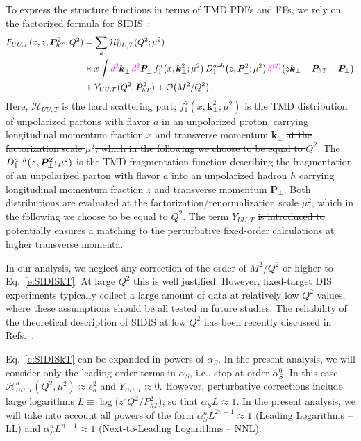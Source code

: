 \documentclass[aps,preprintnumbers,showpacs,nofootinbib,superscriptaddress,floatfix]{revtex4}
\newcommand{\AS}[1]{{\textcolor[rgb]{1,0,1}{#1}}}
\newcommand{\smarrow}{\mbox{\raisebox{-4.5pt}[0pt][0pt]{$\hspace{-1pt} 
		\vec{\phantom{v}}$}}}
\newcommand{\T}{\perp}
\newcommand{\Tperp}{T}
\begin{document}
To express the structure functions in terms of TMD PDFs and FFs, 
we rely on the factorized formula 
for SIDIS~\cite{Collins:1981uk,Collins:1984kg,Ji:2002aa,Ji:2004wu,%
Collins:2011zzd,Aybat:2011zv,GarciaEchevarria:2011rb,Echevarria:2012pw,%
Collins:2012uy}:  
\begin{align}
\label{e:SIDISkT}
   F_{UU,T}(x,z, \bm{P}_{h \Tperp}^2, Q^2) &= \sum_a \mathcal{H}_{UU,T}^{a}(Q^2;\mu^2) \\ 
      &\times x \int \AS{d^2}\bm{k}_\T^{} \, \AS{d^2}\bm{P}_\T^{} \,  f_1^a\big(x,\bm{k}_{\T}^2; \mu^2 \big) \, D_{1}^{a\smarrow h}\big(z,\bm{P}_{\T}^2; \mu^2 \big) \,
      \AS{\delta^{(2)}} \big(z {\bm k}_{\T} - {\bm P}_{h \Tperp} + {\bm P}_{\T}\big)
\nonumber\\&
\nonumber + Y_{UU,T}\big(Q^2, \bm{P}_{h\Tperp}^2\big) + \mathcal{O}\big(M^2/Q^2\big) \, .
\end{align} 
Here, $\mathcal{H}_{UU,T}$ is the hard scattering part; $f_1^a(x,\bm{k}_{\T}^2;
\mu^2)$ is the TMD distribution of unpolarized partons with flavor $a$ in an unpolarized
proton, carrying longitudinal momentum fraction $x$ and transverse momentum
$\bm{k}_\T$ \AS{\sout{at the factorization scale $\mu^2$, which in the following we
choose to be equal to $Q^2$}}.  The $D_1^{a\smarrow h}(z, \bm{P}_{\T}^2;
\mu^2)$ is the TMD fragmentation function describing the fragmentation of an unpolarized parton with flavor $a$ into
an unpolarized hadron $h$ carrying longitudinal momentum fraction $z$ and
transverse momentum $\bm{P}_\T$. 
\AS{Both distributions are evaluated at the factorization/renormalization scale $\mu^2$, which in the following we
choose to be equal to $Q^2$.} 
The term $Y_{UU,T}$ \AS{\sout{is introduced to} potentially ensures} a matching
to the perturbative fixed-order calculations at higher transverse momenta. 

In our analysis, we neglect any correction of the order of $M^2/Q^2$ or higher
to  Eq.~\eqref{e:SIDISkT}.
At large $Q^2$ this is well justified. 
However, fixed-target DIS experiments typically 
collect a large amount of data
at relatively low $Q^2$ values, where these assumptions
should be all tested in future studies. The reliability
of the theoretical description of SIDIS at low $Q^2$ has been recently
discussed in Refs.~\cite{Boglione:2016bph,Moffat:2017sha}.
 
Eq.~\eqref{e:SIDISkT} can be expanded in powers
of $\alpha_S$. In the present analysis, we 
will consider only the leading order terms in $\alpha_S$, i.e., stop at
order $\alpha_S^0$. In this case 
$\mathcal{H}^a_{UU,T} (Q^2, \mu^2) \approx e_a^2$
and $Y_{UU,T}\approx 0$. 
However, perturbative corrections include large logarithms $L \equiv
\log\big(z^2 Q^2/P_{hT}^2\big)$, so that $\alpha_S L \approx 1$.
In the present analysis, we will take into account all 
powers of the form $\alpha_S^n L^{2n-1} \approx 1$ (Leading Logarithms --LL) 
and 
$\alpha_S^n L^{n-1} \approx 1$ (Next-to-Leading Logarithms -- NNL).
\end{document}
